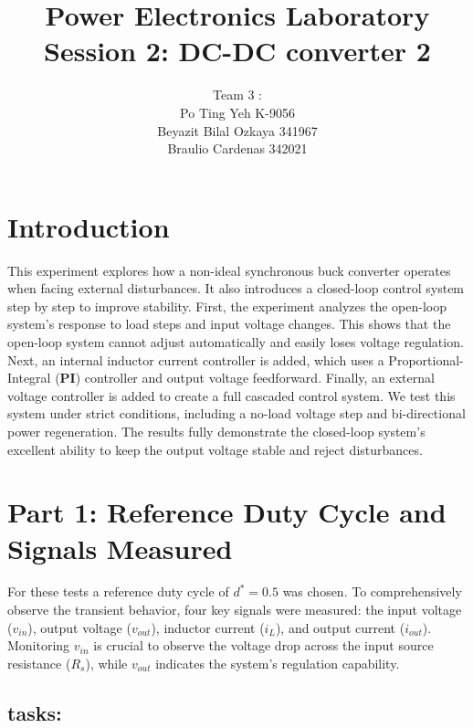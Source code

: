 \documentclass{article}
\title{\textbf{Power Electronics Laboratory
Session 2: DC-DC converter 2}}
\author{Team 3 : \\Po Ting Yeh K-9056 \\Beyazit Bilal Ozkaya 341967 \\Braulio Cardenas 342021}
\begin{document}
\maketitle
\section*{Introduction}
This experiment explores how a non-ideal synchronous buck converter operates when facing external disturbances. It also introduces a closed-loop control system step by step to improve stability. First, the experiment analyzes the open-loop system's response to load steps and input voltage changes. This shows that the open-loop system cannot adjust automatically and easily loses voltage regulation. Next, an internal inductor current controller is added, which uses a Proportional-Integral (\textbf{PI}) controller and output voltage feedforward. Finally, an external voltage controller is added to create a full cascaded control system. We test this system under strict conditions, including a no-load voltage step and bi-directional power regeneration. The results fully demonstrate the closed-loop system's excellent ability to keep the output voltage stable and reject disturbances.


\section{Part 1: \textbf{Reference Duty Cycle and Signals Measured}}

For these tests a reference duty cycle of $d^* = 0.5$ was chosen. To comprehensively observe the transient behavior, four key signals were measured: the input voltage ($v_{in}$), output voltage ($v_{out}$), inductor current ($i_L$), and output current ($i_{out}$). Monitoring $v_{in}$ is crucial to observe the voltage drop across the input source resistance ($R_s$), while $v_{out}$ indicates the system's regulation capability.
\subsection*{tasks:}
\end{document}
